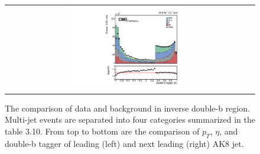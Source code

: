 \begin{figure}[t]
\begin{tabular}{cc}
    \includegraphics[width=0.5\textwidth]{Figures/dataMC_trig_antiDBT/doubleSV_j1.pdf} \\
  \end{tabular}
  \caption{The comparison of data and background in inverse double-b region. Multi-jet events are separated into four categories summarized in the table 3.10. From top to bottom are the comparison of $p_{T}$, $\eta $, and double-b tagger of leading (left) and next leading (right) AK8 jet.}
  \label{fig:hvt_brs}
\end{figure}
